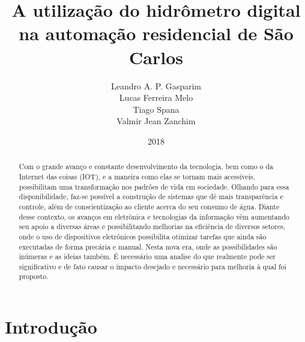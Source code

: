 \documentclass[
	article,			%
	11pt,				%
	oneside,			%
	a4paper,			%
	english,			%
	brazil,				%
	sumario=tradicional
	]{abntex2}
\title{A utilização do hidrômetro digital na automação residencial de São Carlos}
\author{
    Leandro A. P. Gasparim \\
    Lucas Ferreira Melo \\
    Tiago Spana \\
    Valmir Jean Zanchim \\
}
\date{2018}
\begin{document}
\maketitle

\begin{abstract}
   
    Com o grande avanço e constante desenvolvimento da tecnologia, bem como o da Internet das coisas (IOT), e a maneira como elas se tornam mais acessíveis, possibilitam uma transformação nos padrões de vida em sociedade.  Olhando para essa disponibilidade, faz-se possível a construção de sistemas que dê mais transparência e controle, além de conscientização ao cliente acerca do seu consumo de água.
    Diante desse contexto, os avanços em eletrônica e tecnologias da informação vêm aumentando seu apoio a diversas áreas e possibilitando melhorias na eficiência de diversos setores, onde o uso de dispositivos eletrônicos possibilita otimizar tarefas que ainda são executadas de forma precária e manual.
Nesta nova era, onde as possibilidades são inúmeras e as ideias também. É necessário uma analise do que realmente pode ser significativo e de fato causar o impacto desejado e necessário para melhoria à qual foi proposto. 
    
\end{abstract}

\section{Introdução}
\end{document}
